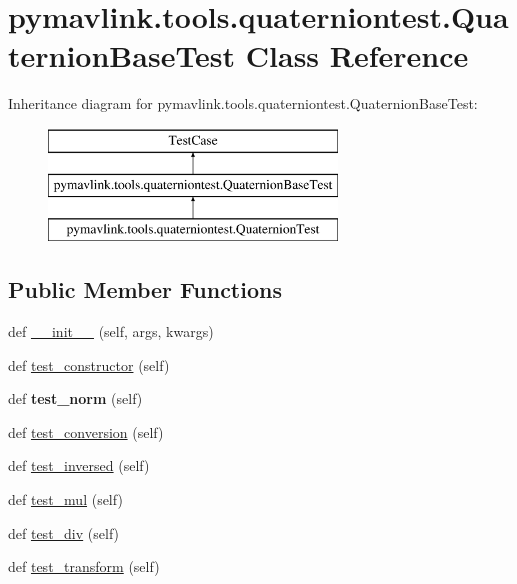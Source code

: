 \hypertarget{classpymavlink_1_1tools_1_1quaterniontest_1_1QuaternionBaseTest}{}\section{pymavlink.\+tools.\+quaterniontest.\+Quaternion\+Base\+Test Class Reference}
\label{classpymavlink_1_1tools_1_1quaterniontest_1_1QuaternionBaseTest}
Inheritance diagram for pymavlink.\+tools.\+quaterniontest.\+Quaternion\+Base\+Test\+:\begin{figure}[H]
\begin{center}
\leavevmode
\includegraphics[height=3.000000cm]{classpymavlink_1_1tools_1_1quaterniontest_1_1QuaternionBaseTest}
\end{center}
\end{figure}
\subsection*{Public Member Functions}
\begin{DoxyCompactItemize}
\item 
def \hyperlink{classpymavlink_1_1tools_1_1quaterniontest_1_1QuaternionBaseTest_ad82d8790ff394411bd472f03b7e5b144}{\+\_\+\+\_\+init\+\_\+\+\_\+} (self, args, kwargs)
\item 
def \hyperlink{classpymavlink_1_1tools_1_1quaterniontest_1_1QuaternionBaseTest_aee2fe80f1010fe9ba9a8bbf8de36fdf9}{test\+\_\+constructor} (self)
\item 
\mbox{\label{classpymavlink_1_1tools_1_1quaterniontest_1_1QuaternionBaseTest_a1a5c5148d31d007ee0751ba4a340c0cc}} 
def {\bfseries test\+\_\+norm} (self)
\item 
def \hyperlink{classpymavlink_1_1tools_1_1quaterniontest_1_1QuaternionBaseTest_a023262d83616fed16f64477e62dc854d}{test\+\_\+conversion} (self)
\item 
def \hyperlink{classpymavlink_1_1tools_1_1quaterniontest_1_1QuaternionBaseTest_aabbf4e0afe54384df13cf048bfb836cb}{test\+\_\+inversed} (self)
\item 
def \hyperlink{classpymavlink_1_1tools_1_1quaterniontest_1_1QuaternionBaseTest_a5562ed24175ffb0c1557e7d63535649b}{test\+\_\+mul} (self)
\item 
def \hyperlink{classpymavlink_1_1tools_1_1quaterniontest_1_1QuaternionBaseTest_af4fb00ca4cf609a2be48e050d049fc00}{test\+\_\+div} (self)
\item 
def \hyperlink{classpymavlink_1_1tools_1_1quaterniontest_1_1QuaternionBaseTest_a834f6d29b7a927b9dc8b0be05c26e9b0}{test\+\_\+transform} (self)
\end{DoxyCompactItemize}
